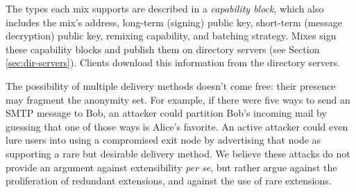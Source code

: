 \documentclass[final,inpress,inline]{ieee}
\begin{document}
%
%

The types each mix supports are described in a \emph{capability block},
which also includes the mix's address, long-term (signing) public key,
short-term (message decryption) public key, remixing capability,
and batching strategy. Mixes sign these capability blocks
and publish them on directory servers (see Section \ref{sec:dir-servers}).
Clients download this information from the directory servers.

%

The possibility of multiple delivery methods doesn't come free: their
presence may fragment the anonymity set.  For example, if there were five
ways to send an SMTP message to Bob, an attacker could partition Bob's
incoming mail by guessing that one of those ways is Alice's favorite.
An active attacker could even lure users into using a compromised
exit node by advertising that node as supporting a
rare but desirable delivery method.
We believe these attacks do not provide an argument against
extensibility \emph{per se}, but rather argue against the proliferation
of redundant extensions, and against the use of rare extensions.  
\end{document}
